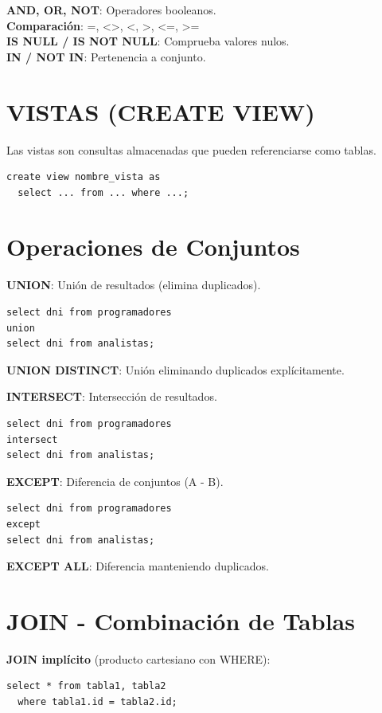 \documentclass[10pt,a4paper,twocolumn]{article}
\begin{document}
\textbf{AND, OR, NOT}: Operadores booleanos.\\
\textbf{Comparación}: =, \textless\textgreater, \textless, \textgreater, \textless=, \textgreater=\\
\textbf{IS NULL / IS NOT NULL}: Comprueba valores nulos.\\
\textbf{IN / NOT IN}: Pertenencia a conjunto.

\section{VISTAS (CREATE VIEW)}

Las vistas son consultas almacenadas que pueden referenciarse como tablas.

\begin{lstlisting}
create view nombre_vista as
  select ... from ... where ...;
\end{lstlisting}

\section{Operaciones de Conjuntos}

\textbf{UNION}: Unión de resultados (elimina duplicados).
\begin{lstlisting}
select dni from programadores
union
select dni from analistas;
\end{lstlisting}

\textbf{UNION DISTINCT}: Unión eliminando duplicados explícitamente.

\textbf{INTERSECT}: Intersección de resultados.
\begin{lstlisting}
select dni from programadores
intersect
select dni from analistas;
\end{lstlisting}

\textbf{EXCEPT}: Diferencia de conjuntos (A - B).
\begin{lstlisting}
select dni from programadores
except
select dni from analistas;
\end{lstlisting}

\textbf{EXCEPT ALL}: Diferencia manteniendo duplicados.

\section{JOIN - Combinación de Tablas}

\textbf{JOIN implícito} (producto cartesiano con WHERE):
\begin{lstlisting}
select * from tabla1, tabla2
  where tabla1.id = tabla2.id;
\end{lstlisting}
\end{document}
